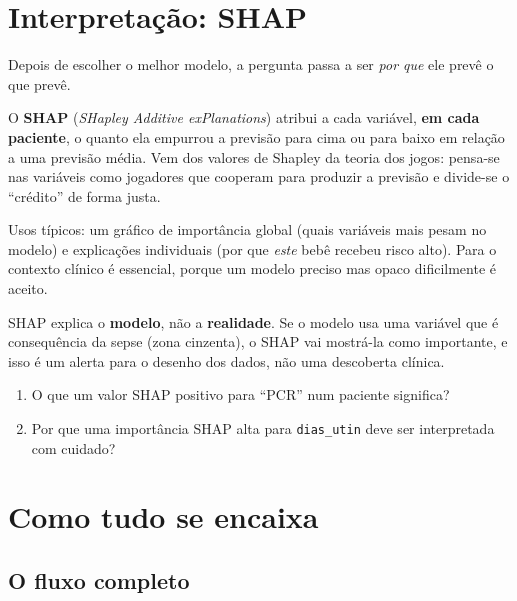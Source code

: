 \documentclass[11pt,a4paper]{article}
\newcommand{\cod}[1]{\texttt{#1}}
\begin{document}
\section{Interpretação: SHAP}

Depois de escolher o melhor modelo, a pergunta passa a ser \emph{por que} ele prevê o que prevê.

\begin{conceito}
O \textbf{SHAP} (\emph{SHapley Additive exPlanations}) atribui a cada variável, \textbf{em cada paciente}, o quanto ela empurrou a previsão
para cima ou para baixo em relação a uma previsão média. Vem dos valores de Shapley da teoria dos jogos: pensa-se nas variáveis como
jogadores que cooperam para produzir a previsão e divide-se o ``crédito'' de forma justa.
\end{conceito}

Usos típicos: um gráfico de importância global (quais variáveis mais pesam no modelo) e explicações individuais (por que \emph{este} bebê recebeu risco alto).
Para o contexto clínico é essencial, porque um modelo preciso mas opaco dificilmente é aceito.

\begin{atencao}
SHAP explica o \textbf{modelo}, não a \textbf{realidade}. Se o modelo usa uma variável que é consequência da sepse (zona cinzenta), o SHAP vai mostrá-la como importante, e isso é um alerta para o desenho dos dados, não uma descoberta clínica.
\end{atencao}

\begin{teste}
\begin{enumerate}
  \item O que um valor SHAP positivo para ``PCR'' num paciente significa?
  \item Por que uma importância SHAP alta para \cod{dias\_utin} deve ser interpretada com cuidado?
\end{enumerate}
\end{teste}

\section{Como tudo se encaixa}

\subsection{O fluxo completo}
\end{document}
